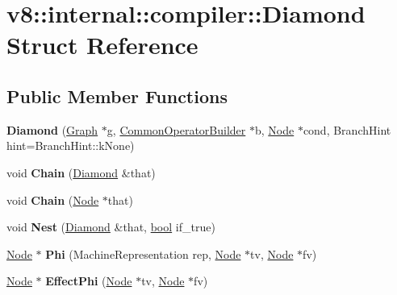 \hypertarget{structv8_1_1internal_1_1compiler_1_1Diamond}{}\section{v8\+:\+:internal\+:\+:compiler\+:\+:Diamond Struct Reference}
\label{structv8_1_1internal_1_1compiler_1_1Diamond}
\subsection*{Public Member Functions}
\begin{DoxyCompactItemize}
\item 
\mbox{\label{structv8_1_1internal_1_1compiler_1_1Diamond_a8b900971f8721586bd23a50ed1858a2a}} 
{\bfseries Diamond} (\mbox{\hyperlink{classv8_1_1internal_1_1compiler_1_1Graph}{Graph}} $\ast$g, \mbox{\hyperlink{classv8_1_1internal_1_1compiler_1_1CommonOperatorBuilder}{Common\+Operator\+Builder}} $\ast$b, \mbox{\hyperlink{classv8_1_1internal_1_1compiler_1_1Node}{Node}} $\ast$cond, Branch\+Hint hint=Branch\+Hint\+::k\+None)
\item 
\mbox{\label{structv8_1_1internal_1_1compiler_1_1Diamond_a939e06d79071c730a3b5495375f3eb5e}} 
void {\bfseries Chain} (\mbox{\hyperlink{structv8_1_1internal_1_1compiler_1_1Diamond}{Diamond}} \&that)
\item 
\mbox{\label{structv8_1_1internal_1_1compiler_1_1Diamond_add0e555d42c3af29a0ebd034a3626f5c}} 
void {\bfseries Chain} (\mbox{\hyperlink{classv8_1_1internal_1_1compiler_1_1Node}{Node}} $\ast$that)
\item 
\mbox{\label{structv8_1_1internal_1_1compiler_1_1Diamond_acf1472476c08f7e6e577f87e887a3e3e}} 
void {\bfseries Nest} (\mbox{\hyperlink{structv8_1_1internal_1_1compiler_1_1Diamond}{Diamond}} \&that, \mbox{\hyperlink{classbool}{bool}} if\+\_\+true)
\item 
\mbox{\label{structv8_1_1internal_1_1compiler_1_1Diamond_a127ef026a0c3a27b220f400493d790f4}} 
\mbox{\hyperlink{classv8_1_1internal_1_1compiler_1_1Node}{Node}} $\ast$ {\bfseries Phi} (Machine\+Representation rep, \mbox{\hyperlink{classv8_1_1internal_1_1compiler_1_1Node}{Node}} $\ast$tv, \mbox{\hyperlink{classv8_1_1internal_1_1compiler_1_1Node}{Node}} $\ast$fv)
\item 
\mbox{\label{structv8_1_1internal_1_1compiler_1_1Diamond_a9e96faf8dd7bc08f78152176f3d7ce19}} 
\mbox{\hyperlink{classv8_1_1internal_1_1compiler_1_1Node}{Node}} $\ast$ {\bfseries Effect\+Phi} (\mbox{\hyperlink{classv8_1_1internal_1_1compiler_1_1Node}{Node}} $\ast$tv, \mbox{\hyperlink{classv8_1_1internal_1_1compiler_1_1Node}{Node}} $\ast$fv)
\end{DoxyCompactItemize}
